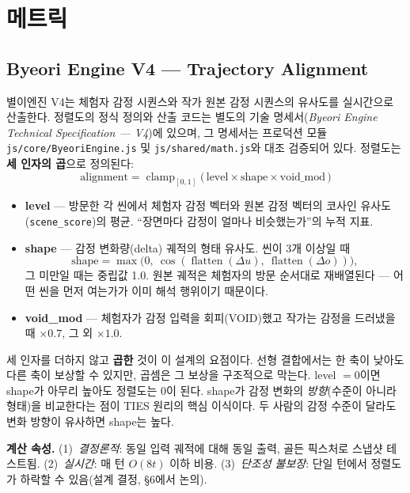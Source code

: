 \documentclass[11pt, a4paper]{article}
\begin{document}
\section{메트릭}

\subsection{Byeori Engine V4 --- Trajectory Alignment}

별이엔진 V4는 체험자 감정 시퀀스와 작가 원본 감정 시퀀스의 유사도를 실시간으로 산출한다. 정렬도의 정식 정의와 산출 코드는 별도의 기술 명세서(\textit{Byeori Engine Technical Specification --- V4})에 있으며, 그 명세서는 프로덕션 모듈 \texttt{js/core/ByeoriEngine.js} 및 \texttt{js/shared/math.js}와 대조 검증되어 있다. 정렬도는 \textbf{세 인자의 곱}으로 정의된다:
\begin{equation}
\text{alignment} = \operatorname{clamp}_{[0,1]}\big(\, \text{level} \times \text{shape} \times \text{void\_mod} \,\big)
\end{equation}

\begin{itemize}
  \item \textbf{level} --- 방문한 각 씬에서 체험자 감정 벡터와 원본 감정 벡터의 코사인 유사도(\texttt{scene\_score})의 평균. ``장면마다 감정이 얼마나 비슷했는가''의 누적 지표.
  \item \textbf{shape} --- 감정 변화량(delta) 궤적의 형태 유사도. 씬이 3개 이상일 때
  \[ \text{shape} = \max\!\big(0,\ \cos(\operatorname{flatten}(\Delta u),\ \operatorname{flatten}(\Delta o))\big), \]
  그 미만일 때는 중립값 1.0. 원본 궤적은 체험자의 방문 순서대로 재배열된다 --- 어떤 씬을 먼저 여는가가 이미 해석 행위이기 때문이다.
  \item \textbf{void\_mod} --- 체험자가 감정 입력을 회피(VOID)했고 작가는 감정을 드러냈을 때 $\times 0.7$, 그 외 $\times 1.0$.
\end{itemize}

세 인자를 더하지 않고 \textbf{곱한} 것이 이 설계의 요점이다. 선형 결합에서는 한 축이 낮아도 다른 축이 보상할 수 있지만, 곱셈은 그 보상을 구조적으로 막는다. level $= 0$이면 shape가 아무리 높아도 정렬도는 0이 된다. shape가 감정 변화의 \textit{방향}(수준이 아니라 형태)을 비교한다는 점이 TIES 원리의 핵심 이식이다. 두 사람의 감정 수준이 달라도 변화 방향이 유사하면 shape는 높다.

\noindent\textbf{계산 속성.} (1)~\textit{결정론적}: 동일 입력 궤적에 대해 동일 출력, 골든 픽스처로 스냅샷 테스트됨. (2)~\textit{실시간}: 매 턴 $O(8t)$ 이하 비용. (3)~\textit{단조성 불보장}: 단일 턴에서 정렬도가 하락할 수 있음(설계 결정, \S6에서 논의).
\end{document}
